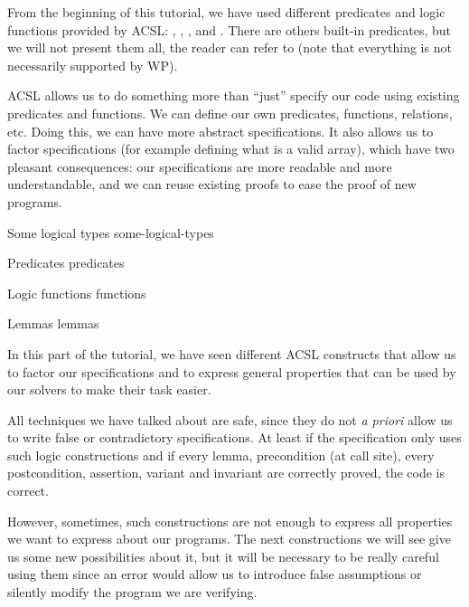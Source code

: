 From the beginning of this tutorial, we have used different predicates
and logic functions provided by ACSL: ,
, ,
 and . There are others
built-in predicates, but we will not present them all, the reader can refer to
(note that everything is not necessarily supported by WP).



ACSL allows us to do something more than ``just'' specify our code using
existing predicates and functions. We can define our own predicates,
functions, relations, etc. Doing this, we can have more abstract
specifications. It also allows us to factor specifications (for example
defining what is a valid array), which have two pleasant consequences:
our specifications are more readable and more understandable, and we can
reuse existing proofs to ease the proof of new programs.



\begin{levelTwo}
  {Some logical types}
  {some-logical-types}
\end{levelTwo}

\begin{levelTwo}
  {Predicates}
  {predicates}
\end{levelTwo}

\begin{levelTwo}
  {Logic functions}
  {functions}
\end{levelTwo}

\begin{levelTwo}
  {Lemmas}
  {lemmas}
\end{levelTwo}

\horizontalLine
\newpage

In this part of the tutorial, we have seen different ACSL constructs that
allow us to factor our specifications and to express general properties
that can be used by our solvers to make their task easier.




All techniques we have talked about are safe, since they do not \emph{a
priori} allow us to write false or contradictory specifications. At
least if the specification only uses such logic constructions and if
every lemma, precondition (at call site), every postcondition,
assertion, variant and invariant are correctly proved, the code is
correct.




However, sometimes, such constructions are not enough to express all
properties we want to express about our programs. The next constructions
we will see give us some new possibilities about it, but it will be
necessary to be really careful using them since an error would allow us
to introduce false assumptions or silently modify the program we are
verifying.
